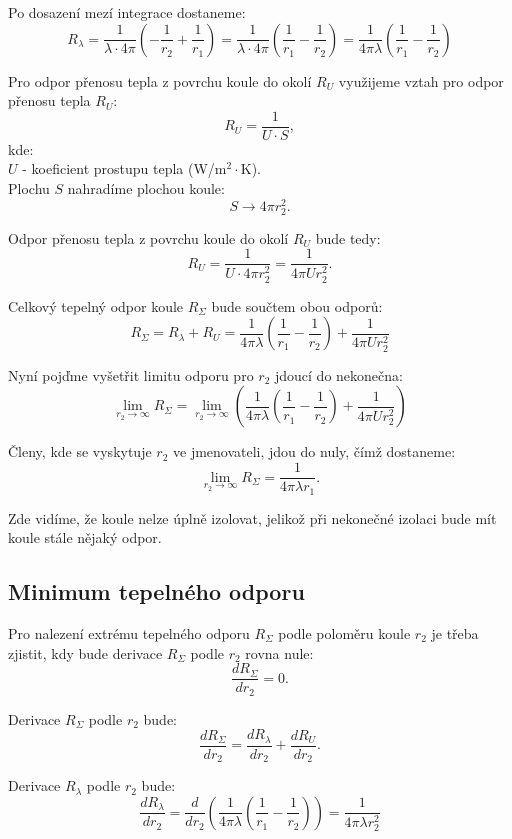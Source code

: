 \documentclass{article}
\begin{document}
Po dosazení mezí integrace dostaneme:
$$
    R_\lambda = \frac{1}{\lambda \cdot 4 \pi} \left( -\frac{1}{r_2} + \frac{1}{r_1} \right) = \frac{1}{\lambda \cdot 4 \pi} \left( \frac{1}{r_1} - \frac{1}{r_2} \right) = \frac{1}{4 \pi \lambda} \left( \frac{1}{r_1} - \frac{1}{r_2} \right)
$$

Pro odpor přenosu tepla z povrchu koule do okolí $R_{U}$ využijeme vztah pro odpor přenosu tepla $R_{U}$:
$$
    R_U = \frac{1}{U \cdot S},
$$
kde:\\
$U$ - koeficient prostupu tepla (W/m$^2 \cdot$K).\\

Plochu $S$ nahradíme plochou koule:
$$
    S \rightarrow 4 \pi r_2^2.
$$

Odpor přenosu tepla z povrchu koule do okolí $R_U$ bude tedy:
$$
    R_U = \frac{1}{U \cdot 4 \pi r_2^2} = \frac{1}{4 \pi U r_2^2}.
$$

Celkový tepelný odpor koule $R_\Sigma$ bude součtem obou odporů:
$$
    R_\Sigma = R_{\lambda} + R_U = \frac{1}{4 \pi \lambda} \left( \frac{1}{r_1} - \frac{1}{r_2} \right) + \frac{1}{4 \pi U r_2^2}
$$

Nyní pojďme vyšetřit limitu odporu pro $r_2$ jdoucí do nekonečna:
$$
    \lim_{r_2 \to \infty} R_\Sigma = \lim_{r_2 \to \infty} \left( \frac{1}{4 \pi \lambda} \left( \frac{1}{r_1} - \frac{1}{r_2} \right) + \frac{1}{4 \pi U r_2^2} \right)
$$

Členy, kde se vyskytuje $r_2$ ve jmenovateli, jdou do nuly, čímž dostaneme:
$$
    \lim_{r_2 \to \infty} R_\Sigma = \frac{1}{4 \pi \lambda r_1}.
$$

Zde vidíme, že koule nelze úplně izolovat, jelikož při nekonečné izolaci bude mít koule stále nějaký odpor.


\subsection{Minimum tepelného odporu}

Pro nalezení extrému tepelného odporu $R_\Sigma$ podle poloměru koule $r_2$ je třeba zjistit, kdy bude derivace $R_\Sigma$ podle $r_2$ rovna nule:
$$
    \frac{dR_\Sigma}{dr_2} = 0.
$$

Derivace $R_\Sigma$ podle $r_2$ bude:
$$
    \frac{dR_\Sigma}{dr_2} = \frac{dR_\lambda}{dr_2} + \frac{dR_U}{dr_2}.
$$

Derivace $R_\lambda$ podle $r_2$ bude:
$$
    \frac{dR_\lambda}{dr_2} = \frac{d}{dr_2} \left( \frac{1}{4 \pi \lambda} \left( \frac{1}{r_1} - \frac{1}{r_2} \right) \right) = \frac{1}{4 \pi \lambda r_2^2}
$$
\end{document}
